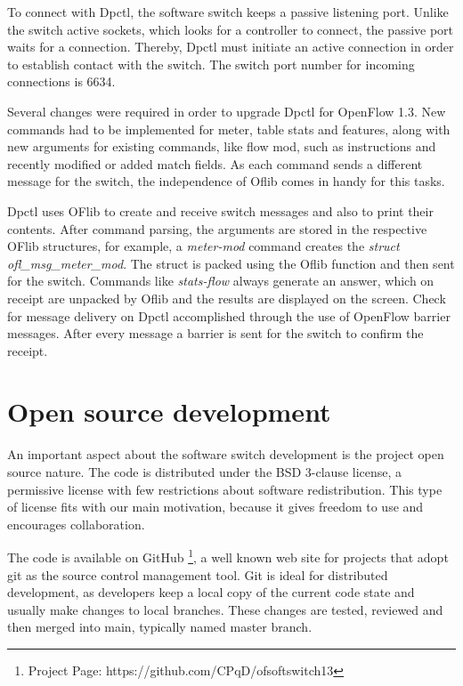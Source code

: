 To connect with Dpctl, the software switch keeps a passive listening port. Unlike the switch active sockets, which looks for a controller to connect, the passive port waits for a connection. Thereby, Dpctl must initiate an active connection in order to establish contact with the switch. The switch port number for incoming connections is 6634.

Several changes were required in order to upgrade Dpctl for OpenFlow 1.3. New commands had to be implemented for meter, table stats and features, along with new arguments for existing commands, like flow mod, such as instructions and recently modified or added match fields. As each command sends a different message for the switch, the independence of Oflib comes in handy for this tasks.  

Dpctl uses OFlib to create and receive switch messages and also to print their contents. After command parsing, the arguments are stored in the respective OFlib structures, for example, a \textit{meter-mod} command creates the \textit{struct ofl_msg_meter_mod}. The struct is packed using the Oflib function and then sent for the switch. Commands like \textit{stats-flow} always generate an answer, which on receipt are unpacked by Oflib and the results are displayed on the screen. Check for message delivery on Dpctl  accomplished through the use of OpenFlow barrier messages. After every message a barrier is sent for the switch to confirm the receipt.


\section{Open source development}
\label{OpenSourceDev}

An important aspect about the software switch development is the project open source nature. The code is distributed under the BSD 3-clause license, a permissive license with few restrictions about software redistribution. This type of license fits with our main motivation, because it gives freedom to use and encourages collaboration. 

The code is available on GitHub \footnote{Project Page: https://github.com/CPqD/ofsoftswitch13}, a well known web site for projects that adopt git \cite{GIT} as the source control management tool. Git is ideal for distributed development, as developers keep a local copy of the current code state and usually make changes to local branches. These changes are tested, reviewed and then merged into main, typically named master branch.    

